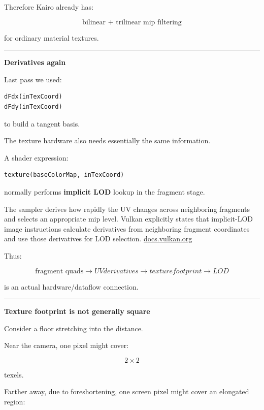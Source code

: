 Therefore Kairo already has:

\[
\boxed{\text{bilinear + trilinear mip filtering}}
\]

for ordinary material textures.

\begin{center}\rule{0.5\linewidth}{0.5pt}\end{center}

\textbf{Derivatives again}

Last pass we used:

\begin{verbatim}
dFdx(inTexCoord)
dFdy(inTexCoord)
\end{verbatim}

to build a tangent basis.

The texture hardware also needs essentially the same information.

A shader expression:

\begin{verbatim}
texture(baseColorMap, inTexCoord)
\end{verbatim}

normally performs \textbf{implicit LOD} lookup in the fragment stage.

The sampler derives how rapidly the UV changes across neighboring fragments and selects an appropriate mip level. Vulkan explicitly states that implicit-LOD image instructions calculate derivatives from neighboring fragment coordinates and use those derivatives for LOD selection. \href{https://docs.vulkan.org/spec/latest/chapters/textures.html?utm_source=chatgpt.com}{docs.vulkan.org}

Thus:

\[
\boxed{
\text{fragment quads}
\rightarrow
UV derivatives
\rightarrow
texture footprint
\rightarrow
LOD
}
\]

is an actual hardware/dataflow connection.

\begin{center}\rule{0.5\linewidth}{0.5pt}\end{center}

\textbf{Texture footprint is not generally square}

Consider a floor stretching into the distance.

Near the camera, one pixel might cover:

\[
2\times2
\]

texels.

Farther away, due to foreshortening, one screen pixel might cover an elongated region:

